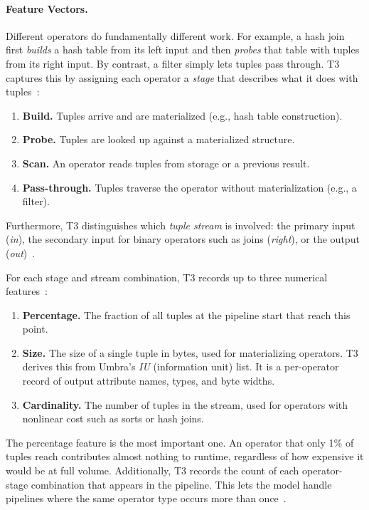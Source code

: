 \paragraph{Feature Vectors.}
Different operators do fundamentally different work.
For example, a hash join first \emph{builds} a hash table from its left input and then \emph{probes} that table with tuples from its right input.
By contrast, a filter simply lets tuples pass through.
T3 captures this by assigning each operator a \emph{stage} that describes what it does with tuples~\parencite{t3}:
\begin{enumerate}
  \item \textbf{Build.} Tuples arrive and are materialized (e.g., hash table construction).
  \item \textbf{Probe.} Tuples are looked up against a materialized structure.
  \item \textbf{Scan.} An operator reads tuples from storage or a previous result.
  \item \textbf{Pass-through.} Tuples traverse the operator without materialization (e.g., a filter).
\end{enumerate}
Furthermore, T3 distinguishes which \emph{tuple stream} is involved: the primary input (\textit{in}), the secondary input for binary operators such as joins (\textit{right}), or the output (\textit{out})~\parencite{t3}.

For each stage and stream combination, T3 records up to three numerical features~\parencite{t3}:
\begin{enumerate}
  \item \textbf{Percentage.} The fraction of all tuples at the pipeline start that reach this point.
  \item \textbf{Size.} The size of a single tuple in bytes, used for materializing operators.
  T3 derives this from Umbra's \emph{IU} (information unit) list. It is a per-operator record of output attribute names, types, and byte widths.
  \item \textbf{Cardinality.} The number of tuples in the stream, used for operators with nonlinear cost such as sorts or hash joins.
\end{enumerate}
The percentage feature is the most important one.
An operator that only 1\% of tuples reach contributes almost nothing to runtime, regardless of how expensive it would be at full volume.
Additionally, T3 records the count of each operator-stage combination that appears in the pipeline.
This lets the model handle pipelines where the same operator type occurs more than once~\parencite{t3}.

